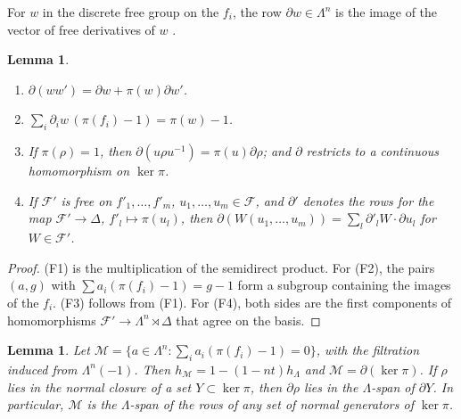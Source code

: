 \documentclass[11pt]{amsart}
\numberwithin{equation}{section}
\newtheorem{lemma}[equation]{Lemma}
\theoremstyle{definition}
\theoremstyle{remark}
\begin{document}
For $w$ in the discrete free group on the $f_i$, the row
$\partial w\in\Lambda^n$ is the image of the vector of free derivatives of $w$
\cite[Section~2]{Fox1953}.

\begin{lemma}\label{tw:row-properties}
\begin{enumerate}
\item[(F1)] $\partial(ww')=\partial w+\pi(w)\partial w'$.
\item[(F2)] $\sum_i\partial_iw\,(\pi(f_i)-1)=\pi(w)-1$.
\item[(F3)] If $\pi(\rho)=1$, then $\partial(u\rho u^{-1})=\pi(u)\partial\rho$;
 and $\partial$ restricts to a continuous homomorphism on $\ker\pi$.
\item[(F4)] If $\mathcal F'$ is free on $f'_1,\dots,f'_m$,
 $u_1,\dots,u_m\in\mathcal F$, and $\partial'$ denotes the rows for the map
 $\mathcal F'\to\Delta$, $f'_l\mapsto\pi(u_l)$, then
 $\partial(W(u_1,\dots,u_m))=\sum_l\partial'_lW\cdot\partial u_l$ for
 $W\in\mathcal F'$.
\end{enumerate}
\end{lemma}

\begin{proof}
(F1) is the multiplication of the semidirect product. For (F2), the pairs
$(a,g)$ with $\sum a_i(\pi(f_i)-1)=g-1$ form a subgroup containing the
images of the $f_i$. (F3) follows from (F1). For (F4), both sides are the first
components of homomorphisms $\mathcal F'\to\Lambda^n\rtimes\Delta$ that agree
on the basis.
\end{proof}

\begin{lemma}\label{tw:fox-rows}
Let $\mathcal M=\{a\in\Lambda^n:\sum_ia_i(\pi(f_i)-1)=0\}$, with the
filtration induced from $\Lambda^n(-1)$. Then
$h_{\mathcal M}=1-(1-nt)h_\Lambda$ and $\mathcal M=\partial(\ker\pi)$. If
$\rho$ lies in the normal closure of a set $Y\subset\ker\pi$, then
$\partial\rho$ lies in the $\Lambda$-span of $\partial Y$. In particular,
$\mathcal M$ is the $\Lambda$-span of the rows of any set of normal
generators of $\ker\pi$.
\end{lemma}
\end{document}
